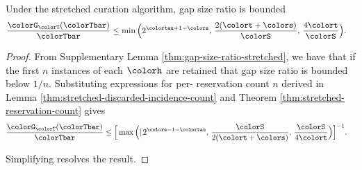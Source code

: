 \begin{theorem}
\label{thm:stretched-gap-size}
Under the stretched curation algorithm, gap size ratio is bounded
\begin{align*}
\frac{\colorG_{\colorT}(\colorTbar)}{\colorTbar}
&\leq
\min\Big(
  2^{\colortau+1-\colors},\,
  \frac{2(\colort + \colors)}{\colorS},\,
  \frac{4\colort}{\colorS}
\Big).
\end{align*}
\end{theorem}
\begin{proof}

From Supplementary Lemma \ref{thm:gap-size-ratio-stretched}, we have that if the first $n$ instances of each \hv{} $\colorh$ are retained that gap size ratio is bounded below $1/n$.
Substituting expressions for per-\hv{} reservation count $n$ derived in Lemma \ref{thm:stretched-discarded-incidence-count} and Theorem \ref{thm:stretched-reservation-count} gives
\begin{align*}
  \frac{\colorG_{\colorT}(\colorTbar)}{\colorTbar}
  &\leq
  \Big[
    \max\Big(
      \lceil 2^{\colors - 1 - \colortau},\,
      \frac{\colorS}{2(\colort + \colors)},\,
      \frac{\colorS}{4\colort}
    \Big)
  \Big]^{-1}.
\end{align*}

Simplifying resolves the result.

\end{proof}

